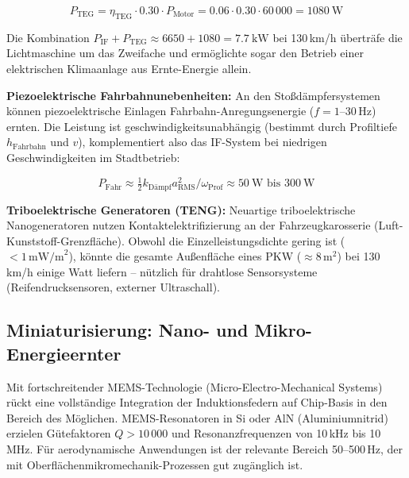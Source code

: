 ﻿\documentclass[12pt, a4paper]{report}
\theoremstyle{definition}
\theoremstyle{remark}
\begin{document}
\begin{equation}
  P_{\text{TEG}} = \eta_{\text{TEG}} \cdot 0.30 \cdot P_{\text{Motor}}
  = 0.06 \cdot 0.30 \cdot 60\,000 = \SI{1080}{\watt}
  \label{eq:p_teg}
\end{equation}

Die Kombination $P_{\text{IF}} + P_{\text{TEG}} \approx 6650 + 1080 = \SI{7.7}{\kilo\watt}$
bei 130\,km/h überträfe die Lichtmaschine um das Zweifache und ermöglichte
sogar den Betrieb einer elektrischen Klimaanlage aus Ernte-Energie allein.

\textbf{Piezoelektrische Fahrbahnunebenheiten:}
An den Stoßdämpfersystemen können piezoelektrische Einlagen
Fahrbahn-Anregungsenergie ($f = 1$--$30\,\text{Hz}$) ernten. Die Leistung
ist geschwindigkeitsunabhängig (bestimmt durch Profiltiefe $h_{\text{Fahrbahn}}$
und $v$), komplementiert also das IF-System bei niedrigen Geschwindigkeiten
im Stadtbetrieb:

\begin{equation}
  P_{\text{Fahr}} \approx \tfrac{1}{2} k_{\text{Dämpf}} a_{\text{RMS}}^2 / \omega_{\text{Prof}}
  \approx \SI{50}{\watt}\text{ bis }\SI{300}{\watt}
  \label{eq:p_fahrbahn}
\end{equation}

\textbf{Triboelektrische Generatoren (TENG):}
Neuartige triboelektrische Nano\-generatoren nutzen Kontaktelektrifizierung
an der Fahrzeugkarosserie (Luft-Kunststoff-Grenzfläche). Obwohl die
Einzelleistungsdichte gering ist ($< 1\,\text{mW/m}^2$), könnte die gesamte
Außenfläche eines PKW ($\approx 8\,\text{m}^2$) bei 130\,km/h einige Watt
liefern -- nützlich für drahtlose Sensorsysteme (Reifendrucksensoren,
externer Ultraschall).

\subsection{Miniaturisierung: Nano- und Mikro-Energieernter}
\label{ssec:ausblick_mems}

Mit fortschreitender MEMS-Technologie (Micro-Electro-Mechanical Systems)
rückt eine vollständige Integration der Induktionsfedern auf Chip-Basis
in den Bereich des Möglichen. MEMS-Resonatoren in Si oder AlN
(Aluminiumnitrid) erzielen Gütefaktoren $Q > 10\,000$ und Resonanz\-frequenzen
von 10\,kHz bis 10\,MHz. Für aerodynamische Anwendungen ist der relevante
Bereich 50--500\,Hz, der mit Oberflächenmikromechanik-Prozessen gut zugänglich ist.
\end{document}
